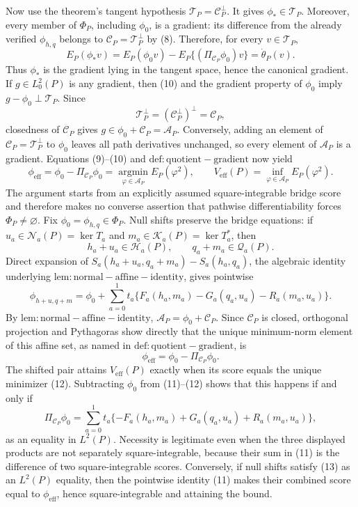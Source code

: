 Now use the theorem's tangent hypothesis \(\mathcal T_P=\mathcal C_P^\perp\).  It gives \(\phi_*\in\mathcal T_P\).  Moreover, every member of \(\Phi_P\), including \(\phi_0\), is a gradient: its difference from the already verified \(\phi_{h,q}\) belongs to \(\mathcal C_P=\mathcal T_P^\perp\) by (8).  Therefore, for every \(v\in\mathcal T_P\),
\[
 E_P(\phi_*v)
 =E_P(\phi_0v)-E_P\{(\Pi_{\mathcal C_P}\phi_0)v\}
 =\dot\theta_P(v).                                                  \tag{10}
\]
Thus \(\phi_*\) is the gradient lying in the tangent space, hence the canonical gradient.  If \(g\in L_0^2(P)\) is any gradient, then (10) and the gradient property of \(\phi_0\) imply \(g-\phi_0\perp\mathcal T_P\).  Since
\[
 \mathcal T_P^\perp=(\mathcal C_P^\perp)^\perp=\mathcal C_P,
\]
closedness of \(\mathcal C_P\) gives \(g\in\phi_0+\mathcal C_P=\mathcal A_P\).  Conversely, adding an element of \(\mathcal C_P=\mathcal T_P^\perp\) to \(\phi_0\) leaves all path derivatives unchanged, so every element of \(\mathcal A_P\) is a gradient.  Equations (9)--(10) and \(\mathrm{def:quotient-gradient}\) now yield
\[
 \phi_{\mathrm{eff}}
 =\phi_0-\Pi_{\mathcal C_P}\phi_0
 =\operatorname*{argmin}_{\varphi\in\mathcal A_P}E_P(\varphi^2),
 \qquad
 V_{\mathrm{eff}}(P)=\inf_{\varphi\in\mathcal A_P}E_P(\varphi^2).
\]
The argument starts from an explicitly assumed square-integrable bridge score and therefore makes no converse assertion that pathwise differentiability forces \(\Phi_P\neq\varnothing\).
Fix \(\phi_0=\phi_{h,q}\in\Phi_P\).  Null shifts preserve the bridge equations: if \(u_a\in\mathcal N_a(P)=\ker T_a\) and \(m_a\in\mathcal K_a(P)=\ker T_a^*\), then
\[
 h_a+u_a\in\mathcal H_a(P),
 \qquad
 q_a+m_a\in\mathcal Q_a(P).
\]
Direct expansion of \(S_a(h_a+u_a,q_a+m_a)-S_a(h_a,q_a)\), the algebraic identity underlying \(\mathrm{lem:normal-affine-identity}\), gives pointwise
\[
 \phi_{h+u,q+m}
 =\phi_0+
 \sum_{a=0}^1t_a\{F_a(h_a,m_a)-G_a(q_a,u_a)-R_a(m_a,u_a)\}.          \tag{11}
\]
By \(\mathrm{lem:normal-affine-identity}\), \(\mathcal A_P=\phi_0+\mathcal C_P\).  Since \(\mathcal C_P\) is closed, orthogonal projection and Pythagoras show directly that the unique minimum-norm element of this affine set, as named in \(\mathrm{def:quotient-gradient}\), is
\[
 \phi_{\mathrm{eff}}=\phi_0-\Pi_{\mathcal C_P}\phi_0.            \tag{12}
\]
The shifted pair attains \(V_{\mathrm{eff}}(P)\) exactly when its score equals the unique minimizer (12).  Subtracting \(\phi_0\) from (11)--(12) shows that this happens if and only if
\[
 \Pi_{\mathcal C_P}\phi_0
 =\sum_{a=0}^1t_a\{-F_a(h_a,m_a)+G_a(q_a,u_a)+R_a(m_a,u_a)\},        \tag{13}
\]
as an equality in \(L^2(P)\).  Necessity is legitimate even when the three displayed products are not separately square-integrable, because their sum in (11) is the difference of two square-integrable scores.  Conversely, if null shifts satisfy (13) as an \(L^2(P)\) equality, then the pointwise identity (11) makes their combined score equal to \(\phi_{\mathrm{eff}}\), hence square-integrable and attaining the bound.

